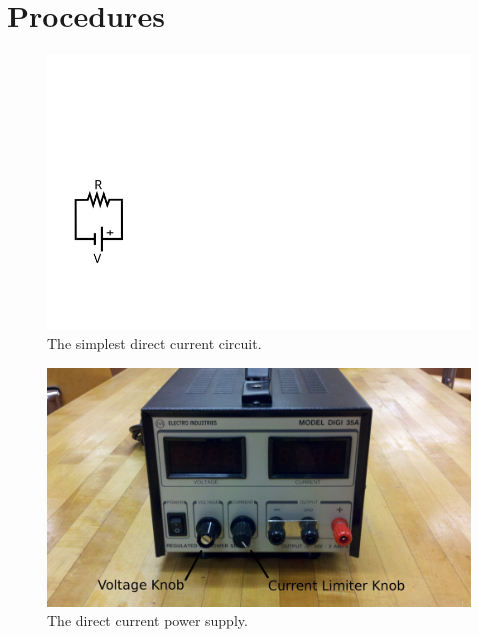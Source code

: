 \documentclass[12pt]{article}
\begin{document}
\section{Procedures}
\label{sec:procedures}

\begin{figure}
  \centering
  \includegraphics[width=\textwidth/5]{figures/simplest}
  \caption{The simplest direct current circuit.}
  \label{fig:simple}
\end{figure}
\begin{figure}
  \centering
\includegraphics[width=\textwidth/2]{figures/electro_digi35a_labeled}
  \caption{The direct current power supply.}
  \label{fig:dcps}
\end{figure}
\end{document}
